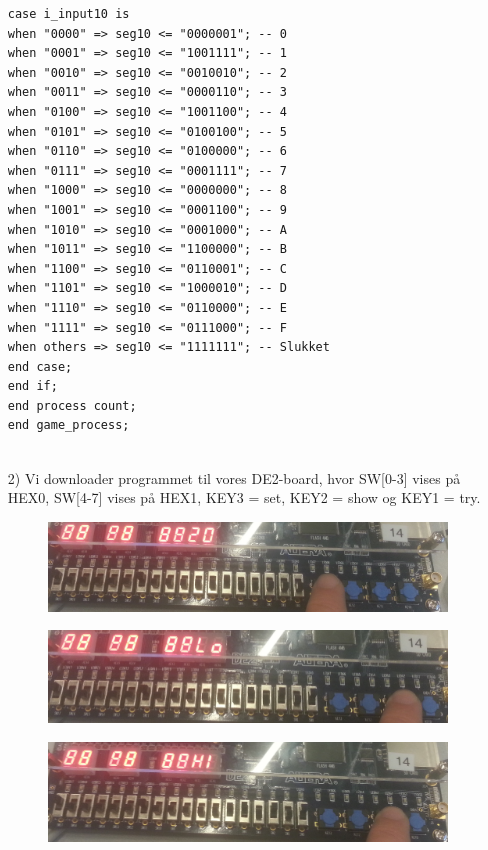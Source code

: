 \begin{enumerate}
\begin{lstlisting}[caption={Behavioral style kode for Guessgame},label={lst:Guessgame}]
case i_input10 is
when "0000" => seg10 <= "0000001"; -- 0
when "0001" => seg10 <= "1001111"; -- 1
when "0010" => seg10 <= "0010010"; -- 2
when "0011" => seg10 <= "0000110"; -- 3
when "0100" => seg10 <= "1001100"; -- 4
when "0101" => seg10 <= "0100100"; -- 5
when "0110" => seg10 <= "0100000"; -- 6
when "0111" => seg10 <= "0001111"; -- 7
when "1000" => seg10 <= "0000000"; -- 8
when "1001" => seg10 <= "0001100"; -- 9
when "1010" => seg10 <= "0001000"; -- A
when "1011" => seg10 <= "1100000"; -- B
when "1100" => seg10 <= "0110001"; -- C
when "1101" => seg10 <= "1000010"; -- D
when "1110" => seg10 <= "0110000"; -- E
when "1111" => seg10 <= "0111000"; -- F
when others => seg10 <= "1111111"; -- Slukket
end case;
end if;
end process count;
end game_process;


	\end{lstlisting}
	\item[2)]
	Vi downloader programmet til vores DE2-board, hvor SW[0-3] vises på HEX0, SW[4-7] vises på HEX1, KEY3 = set, KEY2 = show og KEY1 = try. \\
	\begin{figure}[h]
		\centering
		\includegraphics[scale=0.15]{pictures/Oevelse5/opg3/guess_set.JPG}
		\caption{}
		\label{fig:GuessSet}
	\end{figure}
	\begin{figure}[h]
		\centering
		\includegraphics[scale=0.15]{pictures/Oevelse5/opg3/guess_try_lo.JPG}
		\caption{}
		\label{fig:GuessTryLo}
	\end{figure}
	\begin{figure}[h]
		\centering
		\includegraphics[scale=0.15]{pictures/Oevelse5/opg3/guess_try_hi.JPG}

\end{figure}
\end{enumerate}

